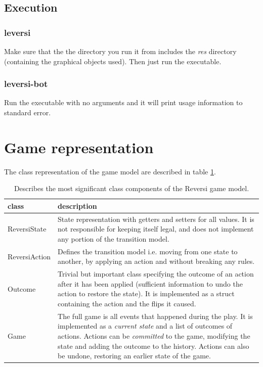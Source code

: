 \documentclass[a4paper,11pt]{article}
\begin{document}
\subsection{Execution}
\subsubsection{leversi}
Make sure that the the directory you run it from includes the \textit{res} directory (containing the graphical objects used). Then just run the executable.

\subsubsection{leversi-bot}
Run the executable with no arguments and it will print usage information to standard error.

\section{Game representation}
The class representation of the game model are described in table \ref{tab:model}.

\begin{table}

\centering
\begin{tabular}{|l|p{12 cm}|}
\hline
\textbf{class} & \textbf{description}
\\ \hline
ReversiState & State representation with getters and setters for all values. It is not responsible for keeping itself legal, and does not implement any portion of the transition model.
\\ \hline
ReversiAction & Defines the transition model i.e. moving from one state to another, by applying an action and without breaking any rules.
\\ \hline
Outcome & Trivial but important class specifying the outcome of an action after it has been applied (sufficient information to undo the action to restore the state). It is implemented as a struct containing the action and the flips it caused.
\\ \hline
Game & The full game is all events that happened during the play. It is implemented as a \textit{current state} and a list of outcomes of actions. Actions can be \textit{committed} to the game, modifying the state and adding the outcome to the history. Actions can also be undone, restoring an earlier state of the game.
\\ \hline
\end{tabular}

\caption{Describes the most significant class components of the Reversi game model.} \label{tab:model}

\end{table}
\end{document}
